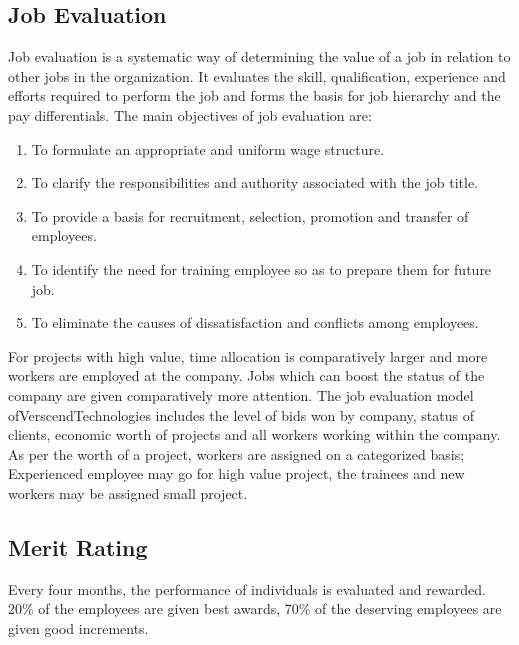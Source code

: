\begin{itemize}
\subsection{Job Evaluation}
Job evaluation is a systematic way of determining the value of a job in relation to other jobs in the organization.
It evaluates the skill, qualification, experience and efforts required to perform the job and forms the basis for
job hierarchy and the pay differentials.
The main objectives of job evaluation are:
\begin{enumerate}
\item  To formulate an appropriate and uniform wage structure.
\item  To clarify the responsibilities and authority associated with the job title.
\item  To provide a basis for recruitment, selection, promotion and transfer of employees.
\item  To identify the need for training employee so as to prepare them for future job.
\item  To eliminate the causes of dissatisfaction and conflicts among employees.
\end{enumerate}
For projects with high value, time allocation is comparatively larger and more workers are employed at the
company. Jobs which can boost the status of the company are given comparatively more attention. The job
evaluation model ofVerscendTechnologies includes the level of bids won by company, status of
clients, economic worth of projects and all workers working within the company. As per the worth of a project,
workers are assigned on a categorized basis; Experienced employee may go for high value project, the trainees
and new workers may be assigned small project.
\subsection{Merit Rating}
Every four months, the performance of individuals is evaluated and rewarded. 20\% of the employees are given
best awards, 70\% of the deserving employees are given good increments.

\end{itemize}

